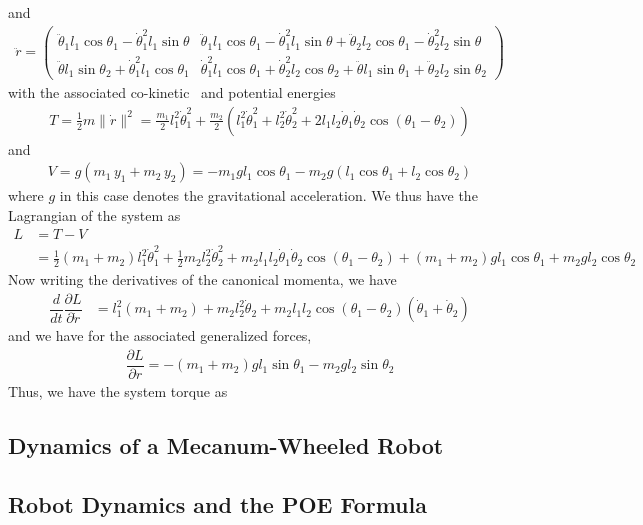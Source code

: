 %
and
%
\begin{align}
\ddot{r} = \left(\begin{array}{c|c}
\ddot{\theta}_1 l_1 \cos \theta_1 - \dot{\theta}_1^2 l_1 \sin \theta  & \ddot{\theta}_1 l_1 \cos \theta_1 - \dot{\theta}_1^2 l_1 \sin \theta  + \ddot{\theta}_2 l_2 \cos \theta_1 - \dot{\theta}_2^2 l_2 \sin \theta
\\
\ddot{\theta} l_1  \sin \theta_2 + \dot{\theta}_1^2 l_1 \cos \theta_1  & 
\dot{\theta}_1^2 l_1 \cos \theta_1  + \dot{\theta}_2^2 l_2 \cos \theta_2  + \ddot{\theta}l_1 \sin \theta_1 + \ddot{\theta}_2 l_2 \sin \theta_2 
\end{array}\right)
\end{align}
%
with the associated co-kinetic~\cite{Stramigioli2001} and potential energies
%
\begin{align}
	T = \frac{1}{2} m \|\dot{r}\|^2 = \frac{m_1}{2}l_1^2 \dot{\theta}_1^2 + \frac{m_2}{2}\left(l_1^2 \dot{\theta}_1^2 + l_2^2 \dot{\theta}_2^2 + 2 l_1 l_2 \dot{\theta}_1 \dot{\theta}_2 \cos(\theta_1 - \theta_2) \right)
\end{align}
%
and
%
\begin{align}
	V = g(m_1 \, y_1 + m_2\, y_2) = -m_1gl_1 \cos \theta_1 - m_2 g \left(l_1 \cos \theta_1 + l_2 \cos \theta_2\right)
\end{align}
%
where $g$ in this case denotes the gravitational acceleration.
%
We thus have the Lagrangian of the system as 
%
\begin{align}
	L & = T - V \nonumber \\
	  & = \frac{1}{2}(m_1 + m_2)l_1^2 \dot{\theta}_1^2 + \frac{1}{2}m_2 l_2^2 \dot{\theta}_2^2 + m_2l_1 l_2 \dot{\theta}_1 \dot{\theta}_2 \cos(\theta_1 - \theta_2) + (m_1 + m_2) g l_1 \cos \theta_1 + m_2 g l_2 \cos \theta_2 
\end{align}
%
Now writing the derivatives of the canonical momenta, we have
%
\begin{align}
\dfrac{d}{dt}\dfrac{\partial L}{\partial \dot{r}} &=  l_1^2(m_1+m_2) + m_2 l_2^2 \dot{\theta}_2 + m_2 l_1 l_2 \cos(\theta_1 - \theta_2)(\dot{\theta}_1 + \dot{\theta}_2) 
\end{align}
%
and we have for the associated generalized forces, 
%
\begin{align}
\dfrac{\partial L}{\partial r} =  %
  - (m_1 + m_2) g l_1 \sin \theta_1 - m_2 g l_2 \sin \theta_2
\end{align}
%
Thus, we have the system torque as 



\subsection{Dynamics of a Mecanum-Wheeled Robot}

\subsection{Robot Dynamics and the POE Formula}



